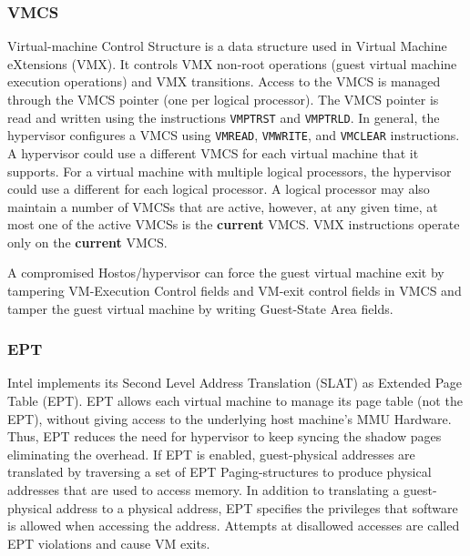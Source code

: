 \subsubsection{VMCS}%
\label{ssub:vmcs}
Virtual-machine Control Structure is a data structure used in Virtual Machine eXtensions (VMX). It controls VMX non-root operations (guest virtual machine execution operations) and VMX transitions. Access to the VMCS is managed through the VMCS pointer (one per logical processor). The VMCS pointer is read and written using the instructions \verb|VMPTRST| and \verb|VMPTRLD|. In general, the hypervisor configures a VMCS using \verb|VMREAD|, \verb|VMWRITE|, and \verb|VMCLEAR| instructions. A hypervisor could use a different VMCS for each virtual machine that it supports. For a virtual machine with multiple logical processors, the hypervisor could use a different for each logical processor. A logical processor may also maintain a number of VMCSs that are active, however, at any given time, at most one of the active VMCSs is the \textbf{current} VMCS. VMX instructions operate only on the \textbf{current} VMCS. 

A compromised Hostos/hypervisor can force the guest virtual machine exit by tampering VM-Execution Control fields and VM-exit control fields in VMCS and tamper the guest virtual machine by writing Guest-State Area fields. 




\subsubsection{EPT}%
\label{ssub:ept}
Intel implements its Second Level Address Translation (SLAT) as Extended Page Table (EPT). 
EPT allows each virtual machine to manage its page table (not the EPT), without giving access to the underlying host machine's MMU Hardware. Thus, EPT reduces the need for hypervisor to keep syncing the shadow pages eliminating the overhead.
If EPT is enabled, guest-physical addresses are translated by traversing a set of EPT Paging-structures to produce physical addresses that are used to access memory.
In addition to translating a guest-physical address to a physical address, EPT specifies the privileges that software is allowed when accessing the address. Attempts at disallowed accesses are called EPT violations and cause VM exits.

